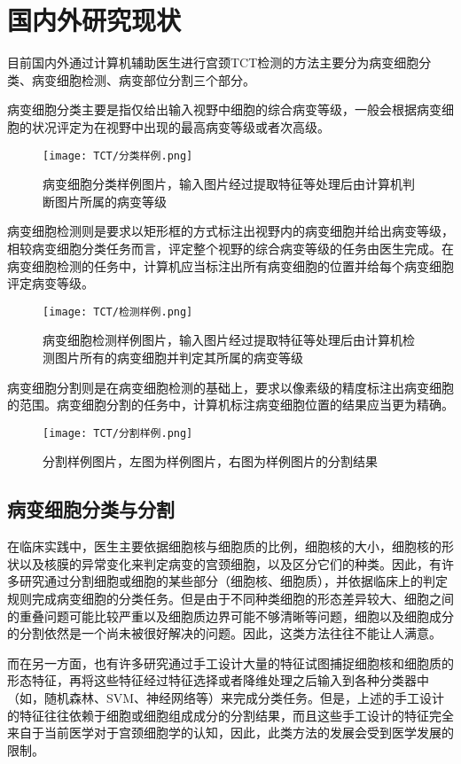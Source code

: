\clearpage

\section{国内外研究现状}
\label{sec:国内外研究现状}
\par 目前国内外通过计算机辅助医生进行宫颈TCT检测的方法主要分为病变细胞分类、病变细胞检测、病变部位分割三个部分。
\par 病变细胞分类主要是指仅给出输入视野中细胞的综合病变等级，一般会根据病变细胞的状况评定为在视野中出现的最高病变等级或者次高级。

\begin{figure}[h]
    \centering
    \texttt{[image: TCT/分类样例.png]}
    \caption{病变细胞分类样例图片，输入图片经过提取特征等处理后由计算机判断图片所属的病变等级}
    \label{pic:分类样例}
\end{figure}
\par 病变细胞检测则是要求以矩形框的方式标注出视野内的病变细胞并给出病变等级，相较病变细胞分类任务而言，评定整个视野的综合病变等级的任务由医生完成。在病变细胞检测的任务中，计算机应当标注出所有病变细胞的位置并给每个病变细胞评定病变等级。

\begin{figure}[h]
    \centering
    \texttt{[image: TCT/检测样例.png]}
    \caption{病变细胞检测样例图片，输入图片经过提取特征等处理后由计算机检测图片所有的病变细胞并判定其所属的病变等级}
    \label{pic:检测样例}
\end{figure}
\par 病变细胞分割则是在病变细胞检测的基础上，要求以像素级的精度标注出病变细胞的范围。病变细胞分割的任务中，计算机标注病变细胞位置的结果应当更为精确。

\begin{figure}[h]
    \centering
    \texttt{[image: TCT/分割样例.png]}
    \caption{分割样例图片，左图为样例图片，右图为样例图片的分割结果}
    \label{pic:分割样例}
\end{figure}

\subsection{病变细胞分类与分割}
\par 在临床实践中，医生主要依据细胞核与细胞质的比例，细胞核的大小，细胞核的形状以及核膜的异常变化来判定病变的宫颈细胞，以及区分它们的种类。因此，有许多研究\cite{zhang2014segmentation}\cite{zhang2017graph}\cite{lee2016segmentation}通过分割细胞或细胞的某些部分（细胞核、细胞质），并依据临床上的判定规则完成病变细胞的分类任务。但是由于不同种类细胞的形态差异较大、细胞之间的重叠问题可能比较严重以及细胞质边界可能不够清晰等问题，细胞以及细胞成分的分割依然是一个尚未被很好解决的问题。因此，这类方法往往不能让人满意。
\par 而在另一方面，也有许多研究\cite{marinakis2009pap}\cite{phoulady2016automatic}通过手工设计大量的特征试图捕捉细胞核和细胞质的形态特征，再将这些特征经过特征选择或者降维处理之后输入到各种分类器中（如，随机森林、SVM、神经网络等）来完成分类任务。但是，上述的手工设计的特征往往依赖于细胞或细胞组成成分的分割结果，而且这些手工设计的特征完全来自于当前医学对于宫颈细胞学的认知，因此，此类方法的发展会受到医学发展的限制。

